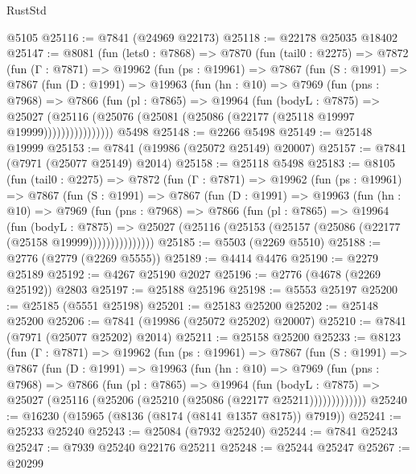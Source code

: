 \begin{lexlean}{RustStd}
\begin{coremodule}
{\begin{coremodule}
{{{{{{{{{{{{{{{{{{{{{{{{{{{{{{{{{{{{{{{{{{{{{{{{{{{{{{    @5105
@25116 := @7841 (@24969 @22173)
@25118 := @22178 @25035 @18402
@25147 := @8081
    (fun (lets0 : @7868) =>
    @7870
      (fun (tail0 : @2275) =>
      @7872
        (fun (Γ : @7871) =>
        @19962
          (fun (ps : @19961) =>
          @7867
            (fun (S : @1991) =>
            @7867
              (fun (D : @1991) =>
              @19963
                (fun (hn : @10) =>
                @7969
                  (fun (pns : @7968) =>
                  @7866
                    (fun (pl : @7865) =>
                    @19964
                      (fun (bodyL : @7875) =>
                      @25027
                        (@25116
                          (@25076 (@25081 (@25086 (@22177 (@25118 @19997 @19999))))))))))))))))
    @5498
@25148 := @2266 @5498
@25149 := @25148 @19999
@25153 := @7841 (@19986 (@25072 @25149) @20007)
@25157 := @7841 (@7971 (@25077 @25149) @2014)
@25158 := @25118 @5498
@25183 := @8105
    (fun (tail0 : @2275) =>
    @7872
      (fun (Γ : @7871) =>
      @19962
        (fun (ps : @19961) =>
        @7867
          (fun (S : @1991) =>
          @7867
            (fun (D : @1991) =>
            @19963
              (fun (hn : @10) =>
              @7969
                (fun (pns : @7968) =>
                @7866
                  (fun (pl : @7865) =>
                  @19964
                    (fun (bodyL : @7875) =>
                    @25027 (@25116 (@25153 (@25157 (@25086 (@22177 (@25158 @19999)))))))))))))))
@25185 := @5503 (@2269 @5510)
@25188 := @2776 (@2779 (@2269 @5555))
@25189 := @4414 @4476
@25190 := @2279 @25189
@25192 := @4267 @25190 @2027
@25196 := @2776 (@4678 (@2269 @25192)) @2803
@25197 := @25188 @25196
@25198 := @5553 @25197
@25200 := @25185 (@5551 @25198)
@25201 := @25183 @25200
@25202 := @25148 @25200
@25206 := @7841 (@19986 (@25072 @25202) @20007)
@25210 := @7841 (@7971 (@25077 @25202) @2014)
@25211 := @25158 @25200
@25233 := @8123
    (fun (Γ : @7871) =>
    @19962
      (fun (ps : @19961) =>
      @7867
        (fun (S : @1991) =>
        @7867
          (fun (D : @1991) =>
          @19963
            (fun (hn : @10) =>
            @7969
              (fun (pns : @7968) =>
              @7866
                (fun (pl : @7865) =>
                @19964
                  (fun (bodyL : @7875) =>
                  @25027 (@25116 (@25206 (@25210 (@25086 (@22177 @25211)))))))))))))
@25240 := @16230 (@15965 (@8136 (@8174 (@8141 @1357 @8175)) @7919))
@25241 := @25233 @25240
@25243 := @25084 (@7932 @25240)
@25244 := @7841 @25243
@25247 := @7939 @25240 @22176 @25211
@25248 := @25244 @25247
@25267 := @20299
}}}}}}}}}}}}}}}}}}}}}}}}}}}}}}}}}}}}}}}}}}}}}}}}}}}}}}
\end{coremodule}}
\end{coremodule}
\end{lexlean}
